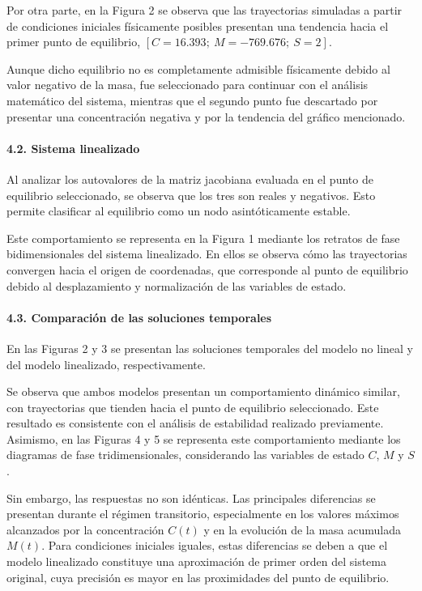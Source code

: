 \documentclass[11pt]{article}
\begin{document}
Por otra parte, en la Figura 2 se observa que las trayectorias simuladas
a partir de condiciones iniciales físicamente posibles presentan una
tendencia hacia el primer punto de equilibrio,
\([C=16.393;\ M=-769.676;\ S=2]\).

Aunque dicho equilibrio no es completamente admisible físicamente debido
al valor negativo de la masa, fue seleccionado para continuar con el
análisis matemático del sistema, mientras que el segundo punto fue
descartado por presentar una concentración negativa y por la tendencia
del gráfico mencionado.

\paragraph{4.2. Sistema linealizado}\label{sistema-linealizado}

Al analizar los autovalores de la matriz jacobiana evaluada en el punto
de equilibrio seleccionado, se observa que los tres son reales y
negativos. Esto permite clasificar al equilibrio como un nodo
asintóticamente estable.

Este comportamiento se representa en la Figura 1 mediante los retratos
de fase bidimensionales del sistema linealizado. En ellos se observa
cómo las trayectorias convergen hacia el origen de coordenadas, que
corresponde al punto de equilibrio debido al desplazamiento y
normalización de las variables de estado.

\paragraph{4.3. Comparación de las soluciones
temporales}\label{comparaciuxf3n-de-las-soluciones-temporales}

En las Figuras 2 y 3 se presentan las soluciones temporales del modelo
no lineal y del modelo linealizado, respectivamente.

Se observa que ambos modelos presentan un comportamiento dinámico
similar, con trayectorias que tienden hacia el punto de equilibrio
seleccionado. Este resultado es consistente con el análisis de
estabilidad realizado previamente. Asimismo, en las Figuras 4 y 5 se
representa este comportamiento mediante los diagramas de fase
tridimensionales, considerando las variables de estado \(C\), \(M\) y
\(S\).

Sin embargo, las respuestas no son idénticas. Las principales
diferencias se presentan durante el régimen transitorio, especialmente
en los valores máximos alcanzados por la concentración \(C(t)\) y en la
evolución de la masa acumulada \(M(t)\). Para condiciones iniciales
iguales, estas diferencias se deben a que el modelo linealizado
constituye una aproximación de primer orden del sistema original, cuya
precisión es mayor en las proximidades del punto de equilibrio.
\end{document}
